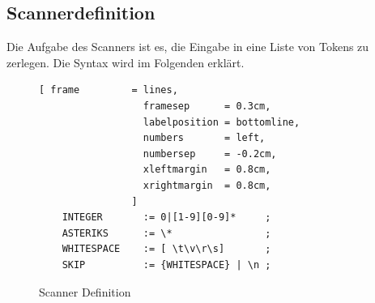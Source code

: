 \subsection{Scannerdefinition}
Die Aufgabe des Scanners ist es, die Eingabe in eine Liste von Tokens zu zerlegen. Die Syntax wird im Folgenden erklärt.
\begin{figure}[!ht]
\begin{Verbatim}[ frame         = lines, 
                  framesep      = 0.3cm, 
                  labelposition = bottomline,
                  numbers       = left,
                  numbersep     = -0.2cm,
                  xleftmargin   = 0.8cm,
                  xrightmargin  = 0.8cm,
                ]
	INTEGER       := 0|[1-9][0-9]*     ;
	ASTERIKS      := \*                ;
	WHITESPACE    := [ \t\v\r\s]       ;
	SKIP          := {WHITESPACE} | \n ;
\end{Verbatim}
\caption{Scanner Definition}
\label{fig:scanner_def}
\end{figure}
